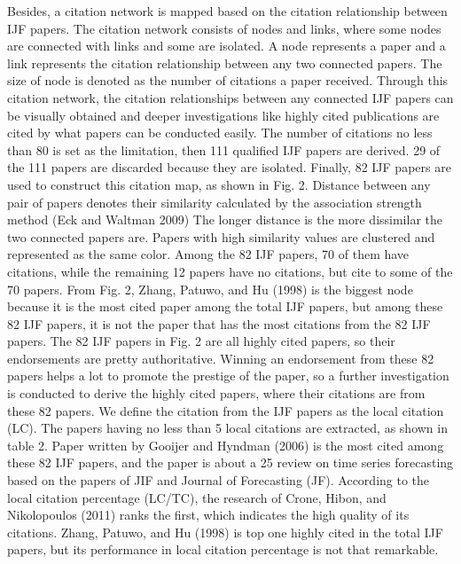 \documentclass[11pt,a4paper]{elsarticle} %
\begin{document}
Besides, a citation network is mapped based on the citation relationship
between IJF papers. The citation network consists of nodes and links,
where some nodes are connected with links and some are isolated. A node
represents a paper and a link represents the citation relationship
between any two connected papers. The size of node is denoted as the
number of citations a paper received. Through this citation network, the
citation relationships between any connected IJF papers can be visually
obtained and deeper investigations like highly cited publications are
cited by what papers can be conducted easily. The number of citations no
less than 80 is set as the limitation, then 111 qualified IJF papers are
derived. 29 of the 111 papers are discarded because they are isolated.
Finally, 82 IJF papers are used to construct this citation map, as shown
in Fig. 2. Distance between any pair of papers denotes their similarity
calculated by the association strength method (Eck and Waltman 2009) The
longer distance is the more dissimilar the two connected papers are.
Papers with high similarity values are clustered and represented as the
same color. Among the 82 IJF papers, 70 of them have citations, while
the remaining 12 papers have no citations, but cite to some of the 70
papers. From Fig. 2, Zhang, Patuwo, and Hu (1998) is the biggest node
because it is the most cited paper among the total IJF papers, but among
these 82 IJF papers, it is not the paper that has the most citations
from the 82 IJF papers. The 82 IJF papers in Fig. 2 are all highly cited
papers, so their endorsements are pretty authoritative. Winning an
endorsement from these 82 papers helps a lot to promote the prestige of
the paper, so a further investigation is conducted to derive the highly
cited papers, where their citations are from these 82 papers. We define
the citation from the IJF papers as the local citation (LC). The papers
having no less than 5 local citations are extracted, as shown in table
2. Paper written by Gooijer and Hyndman (2006) is the most cited among
these 82 IJF papers, and the paper is about a 25 review on time series
forecasting based on the papers of JIF and Journal of Forecasting (JF).
According to the local citation percentage (LC/TC), the research of
Crone, Hibon, and Nikolopoulos (2011) ranks the first, which indicates
the high quality of its citations. Zhang, Patuwo, and Hu (1998) is top
one highly cited in the total IJF papers, but its performance in local
citation percentage is not that remarkable.
\end{document}
